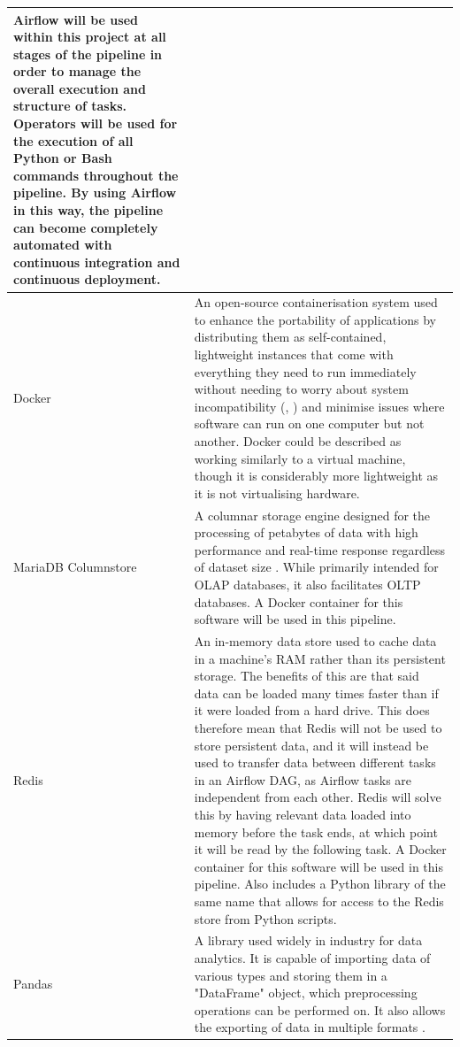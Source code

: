 \documentclass[12pt]{report}
\begin{document}
\begin{longtable}{ |p{}| p{}|}
    Airflow will be used within this project at all stages of the pipeline in order to manage the overall 
    execution and structure of tasks. Operators will be used for the execution of all Python or Bash 
    commands throughout the pipeline. By using Airflow in this way, the pipeline can become completely 
    automated with continuous integration and continuous deployment.
    \\
    \hline
    Docker &
    An open-source containerisation system used to enhance the portability of applications by distributing 
    them as self-contained, lightweight instances that come with everything they need to run immediately 
    without needing to worry about system incompatibility (\textcite{aws_what_nodate}, \textcite{docker_docker_2022})
    and minimise issues where software can run on one computer but not another. Docker could be described 
    as working similarly to a virtual machine, though it is considerably more lightweight as it is not 
    virtualising hardware.\\
    \hline
    MariaDB Columnstore &
    A columnar storage engine designed for the processing of petabytes of data with high performance 
    and real-time response regardless of dataset size \autocite{mariadb_mariadb_nodate}. While 
    primarily intended for OLAP databases, it also facilitates OLTP databases. A Docker container 
    for this software will be used in this pipeline.\\
    \hline 
    Redis &
    An in-memory data store used to cache data in a machine's RAM rather than its 
    persistent storage. The benefits of this are that said data can be loaded many times faster than if 
    it were loaded from a hard drive. This does therefore mean that Redis will not be used to store persistent data,
    and it will instead be used to transfer data between different tasks in an Airflow DAG, as Airflow tasks 
    are independent from each other. Redis will solve this by having relevant data loaded into memory before 
    the task ends, at which point it will be read by the following task. A Docker container for this 
    software will be used in this pipeline. Also includes a Python library of the same name that allows 
    for access to the Redis store from Python scripts.\\
    \hline
    Pandas &
    A library used widely in industry for data analytics. It is capable of importing data of various 
    types and storing them in a "DataFrame" object, which preprocessing operations can be performed on.
    It also allows the exporting of data in multiple formats \autocite{pandas_pandas_nodate}.\\

\end{longtable}
\end{document}
